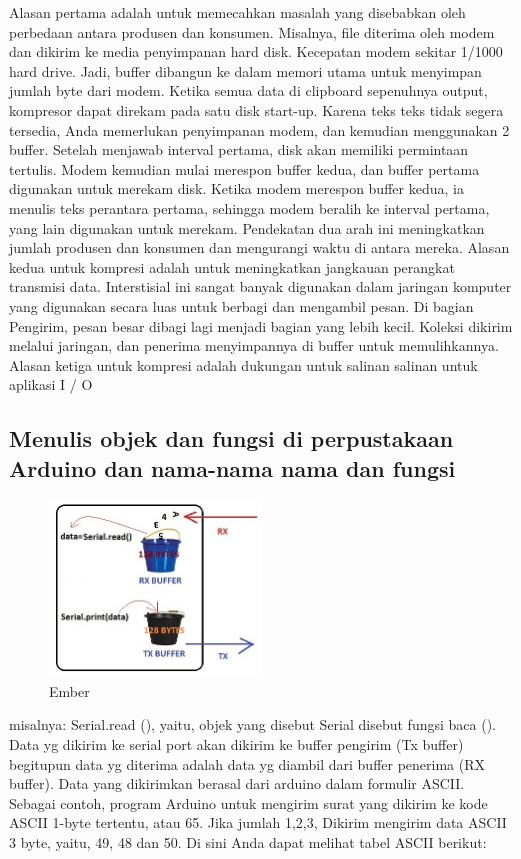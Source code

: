 Alasan pertama adalah untuk memecahkan masalah yang disebabkan oleh perbedaan antara produsen dan konsumen. Misalnya, file diterima oleh modem dan dikirim ke media penyimpanan hard disk. Kecepatan modem sekitar 1/1000 hard drive. Jadi, buffer dibangun ke dalam memori utama untuk menyimpan jumlah byte dari modem. Ketika semua data di clipboard sepenuhnya output, kompresor dapat direkam pada satu disk start-up. Karena teks teks tidak segera tersedia, Anda memerlukan penyimpanan modem, dan kemudian menggunakan 2 buffer. Setelah menjawab interval pertama, disk akan memiliki permintaan tertulis. Modem kemudian mulai merespon buffer kedua, dan buffer pertama digunakan untuk merekam disk. Ketika modem merespon buffer kedua, ia menulis teks perantara pertama, sehingga modem beralih ke interval pertama, yang lain digunakan untuk merekam. Pendekatan dua arah ini meningkatkan jumlah produsen dan konsumen dan mengurangi waktu di antara mereka. Alasan kedua untuk kompresi adalah untuk meningkatkan jangkauan perangkat transmisi data. Interstisial ini sangat banyak digunakan dalam jaringan komputer yang digunakan secara luas untuk berbagi dan mengambil pesan. Di bagian Pengirim, pesan besar dibagi lagi menjadi bagian yang lebih kecil. Koleksi dikirim melalui jaringan, dan penerima menyimpannya di buffer untuk memulihkannya. 
Alasan ketiga untuk kompresi adalah dukungan untuk salinan salinan untuk aplikasi I / O

\subsection {Menulis objek dan fungsi di perpustakaan Arduino dan nama-nama nama dan fungsi}

\begin{figure}[ht]
\centerline{\includegraphics[width=0.5\textwidth]{figures/ember.jpg}}
\caption{Ember}
\label{ember}
\end{figure}

misalnya: Serial.read (), yaitu, objek yang disebut Serial disebut fungsi baca ().
Data yg dikirim  ke serial port  akan dikirim ke buffer pengirim (Tx buffer)  begitupun data yg diterima  adalah data yg diambil  dari  buffer penerima (RX buffer). Data yang dikirimkan berasal dari arduino dalam formulir ASCII. Sebagai contoh, program Arduino untuk mengirim surat yang dikirim ke kode ASCII 1-byte tertentu, atau 65. Jika jumlah 1,2,3, Dikirim mengirim data ASCII 3 byte, yaitu, 49, 48 dan 50. Di sini Anda dapat melihat tabel ASCII berikut:

